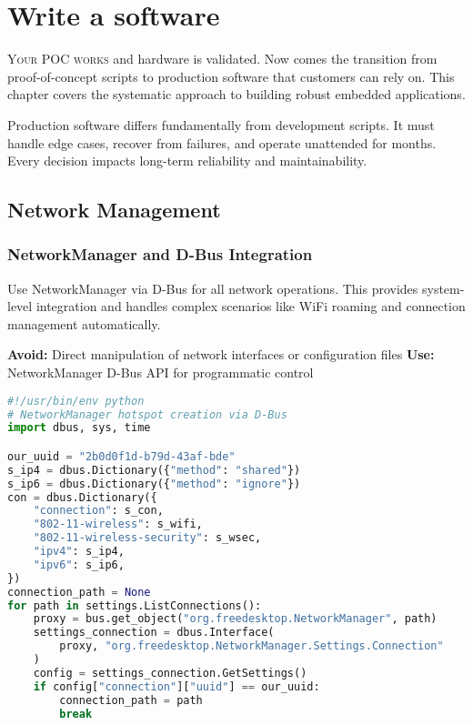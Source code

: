 \chapter{Write a software}

\lettrine{Y}{our POC works} and hardware is validated. Now comes the transition from proof-of-concept scripts to production software that customers can rely on. This chapter covers the systematic approach to building robust embedded applications.

Production software differs fundamentally from development scripts. It must handle edge cases, recover from failures, and operate unattended for months. Every decision impacts long-term reliability and maintainability.

\section{Network Management}

\subsection{NetworkManager and D-Bus Integration}

Use NetworkManager via D-Bus for all network operations. This provides system-level integration and handles complex scenarios like WiFi roaming and connection management automatically.

\textbf{Avoid:} Direct manipulation of network interfaces or configuration files
\textbf{Use:} NetworkManager D-Bus API for programmatic control

\begin{tcolorbox}[colback=gray!5,colframe=gray!50,title=Hotspot Creation Example]
\begin{lstlisting}[language=Python,basicstyle=\footnotesize\ttfamily]
#!/usr/bin/env python
# NetworkManager hotspot creation via D-Bus
import dbus, sys, time

our_uuid = "2b0d0f1d-b79d-43af-bde"
s_ip4 = dbus.Dictionary({"method": "shared"})
s_ip6 = dbus.Dictionary({"method": "ignore"})
con = dbus.Dictionary({
    "connection": s_con,
    "802-11-wireless": s_wifi,
    "802-11-wireless-security": s_wsec,
    "ipv4": s_ip4,
    "ipv6": s_ip6,
})
connection_path = None
for path in settings.ListConnections():
    proxy = bus.get_object("org.freedesktop.NetworkManager", path)
    settings_connection = dbus.Interface(
        proxy, "org.freedesktop.NetworkManager.Settings.Connection"
    )
    config = settings_connection.GetSettings()
    if config["connection"]["uuid"] == our_uuid:
        connection_path = path
        break

\end{lstlisting}
\end{tcolorbox}

